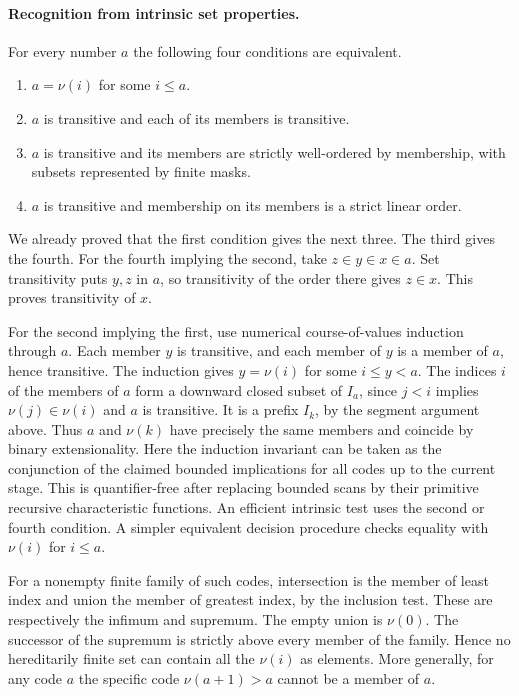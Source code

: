 \paragraph{Recognition from intrinsic set properties.}
For every number $a$ the following four conditions are equivalent.
\begin{enumerate}
\item $a=\nu(i)$ for some $i\le a$.
\item $a$ is transitive and each of its members is transitive.
\item $a$ is transitive and its members are strictly well-ordered by
membership, with subsets represented by finite masks.
\item $a$ is transitive and membership on its members is a strict
linear order.
\end{enumerate}
We already proved that the first condition gives the next three. The
third gives the fourth. For the fourth implying the second, take
$z\in y\in x\in a$. Set transitivity puts $y,z$ in $a$, so
transitivity of the order there gives $z\in x$. This proves
transitivity of $x$.

For the second implying the first, use numerical course-of-values
induction through $a$. Each member $y$ is transitive, and each member
of $y$ is a member of $a$, hence transitive. The induction gives
$y=\nu(i)$ for some $i\le y<a$. The indices $i$ of the members of $a$
form a downward closed subset of $I_a$, since $j<i$ implies
$\nu(j)\in\nu(i)$ and $a$ is transitive. It is a prefix $I_k$, by the
segment argument above. Thus $a$ and $\nu(k)$ have precisely the same
members and coincide by binary extensionality. Here the induction
invariant can be taken as the conjunction of the claimed bounded
implications for all codes up to the current stage. This is
quantifier-free after replacing bounded scans by their primitive
recursive characteristic functions. An efficient intrinsic test uses
the second or fourth condition. A simpler equivalent decision
procedure checks equality with $\nu(i)$ for $i\le a$.

For a nonempty finite family of such codes, intersection is the member
of least index and union the member of greatest index, by the inclusion
test. These are respectively the infimum and supremum. The empty union
is $\nu(0)$. The successor of the supremum is strictly above every
member of the family. Hence no hereditarily finite set can contain all
the $\nu(i)$ as elements. More generally, for any code $a$ the specific
code $\nu(a+1)>a$ cannot be a member of $a$.

